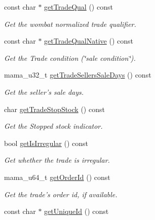 \begin{CompactItemize}
const char $\ast$ \hyperlink{classWombat_1_1MamdaTradeListener_0f03f8d8b20f08eab587e439a939d0fc}{get\-Trade\-Qual} () const 
\begin{CompactList}\small\item\em Get the wombat normalized trade qualifier. \item\end{CompactList}\item 
const char $\ast$ \hyperlink{classWombat_1_1MamdaTradeListener_7b01373c290fe46a0a1e00a861996a06}{get\-Trade\-Qual\-Native} () const 
\begin{CompactList}\small\item\em Get the Trade condition (\char`\"{}sale condition\char`\"{}). \item\end{CompactList}\item 
mama\_\-u32\_\-t \hyperlink{classWombat_1_1MamdaTradeListener_719ed8fafd8f299b274ba2f11981b3ba}{get\-Trade\-Sellers\-Sale\-Days} () const 
\begin{CompactList}\small\item\em Get the seller's sale days. \item\end{CompactList}\item 
char \hyperlink{classWombat_1_1MamdaTradeListener_2d4333ba424d00cbda5e88a846ef3c8c}{get\-Trade\-Stop\-Stock} () const 
\begin{CompactList}\small\item\em Get the Stopped stock indicator. \item\end{CompactList}\item 
bool \hyperlink{classWombat_1_1MamdaTradeListener_1a5b54d3d63c62bf8720cc29dd40b25a}{get\-Is\-Irregular} () const 
\begin{CompactList}\small\item\em Get whether the trade is irregular. \item\end{CompactList}\item 
mama\_\-u64\_\-t \hyperlink{classWombat_1_1MamdaTradeListener_46c9913f3bc9f7e31f07afa76eaed7ff}{get\-Order\-Id} () const 
\begin{CompactList}\small\item\em Get the trade's order id, if available. \item\end{CompactList}\item 
const char $\ast$ \hyperlink{classWombat_1_1MamdaTradeListener_997416236d779434a70ff52427ac9b8f}{get\-Unique\-Id} () const 

\end{CompactItemize}
